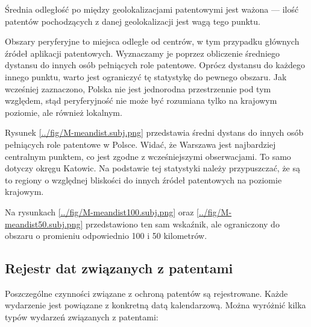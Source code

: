 \begin{multicols}{2}


\begin{uwaga}
Średnia odległość po między geolokalizacjami patentowymi jest ważona ---
ilość patentów pochodzących z danej geolokalizacji jest wagą tego punktu.
\end{uwaga}

\end{multicols}

Obszary peryferyjne to miejsca odległe od centrów, w tym przypadku
głównych źródeł aplikacji patentowych. Wyznaczamy je poprzez obliczenie
średniego dystansu do innych osób pełniących role patentowe.
Oprócz dystansu do każdego innego punktu, warto jest ograniczyć
tę statystykę do pewnego obszaru. Jak wcześniej zaznaczono, Polska
nie jest jednorodna przestrzennie pod tym względem, stąd peryferyjność
nie może być rozumiana tylko na krajowym poziomie, ale również lokalnym.

Rysunek \ref{../fig/M-meandist.subj.png} przedstawia średni dystans
do innych osób pełniących role patentowe w Polsce. Widać, że Warszawa
jest najbardziej centralnym punktem, co jest zgodne z wcześniejszymi
obserwacjami. To samo dotyczy okręgu Katowic. Na podstawie tej statystyki 
należy przypuszczać, że są to regiony o względnej bliskości 
do innych źródeł patentowych na poziomie krajowym.

Na rysunkach \ref{../fig/M-meandist100.subj.png} oraz
\ref{../fig/M-meandist50.subj.png} przedstawiono ten sam
wskaźnik, ale ograniczony do obszaru o promieniu odpowiednio 100 i 50 kilometrów.



\subsection{Rejestr dat związanych z patentami}

Poszczególne czynności związane z ochroną patentów są rejestrowane.
Każde wydarzenie jest powiązane z konkretną datą kalendarzową.
Można wyróżnić kilka typów wydarzeń związanych z patentami:

